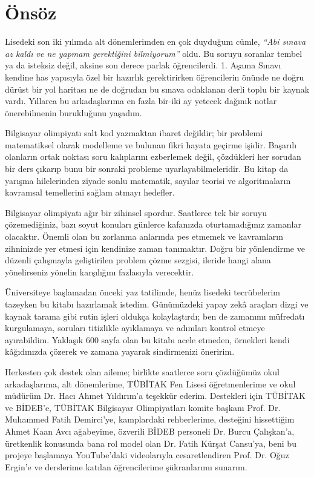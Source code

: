 \chapter*{Önsöz}
\enlargethispage{\baselineskip}

Lisedeki son iki yılımda alt dönemlerimden en çok duyduğum cümle, \textit{``Abi sınava az kaldı ve ne yapmam gerektiğini bilmiyorum''} oldu. Bu soruyu soranlar tembel ya da isteksiz değil, aksine son derece parlak öğrencilerdi. 1. Aşama Sınavı kendine has yapısıyla özel bir hazırlık gerektirirken öğrencilerin önünde ne doğru dürüst bir yol haritası ne de doğrudan bu sınava odaklanan derli toplu bir kaynak vardı. Yıllarca bu arkadaşlarıma en fazla bir-iki ay yetecek dağınık notlar önerebilmenin burukluğunu yaşadım.

Bilgisayar olimpiyatı salt kod yazmaktan ibaret değildir; bir problemi matematiksel olarak modelleme ve bulunan fikri hayata geçirme işidir. Başarılı olanların ortak noktası soru kalıplarını ezberlemek değil, çözdükleri her sorudan bir ders çıkarıp bunu bir sonraki probleme uyarlayabilmeleridir. Bu kitap da yarışma hilelerinden ziyade sonlu matematik, sayılar teorisi ve algoritmaların kavramsal temellerini sağlam atmayı hedefler.

Bilgisayar olimpiyatı ağır bir zihinsel spordur. Saatlerce tek bir soruyu çözemediğiniz, bazı soyut konuları günlerce kafanızda oturtamadığınız zamanlar olacaktır. Önemli olan bu zorlanma anlarında pes etmemek ve kavramların zihninizde yer etmesi için kendinize zaman tanımaktır. Doğru bir yönlendirme ve düzenli çalışmayla geliştirilen problem çözme sezgisi, ileride hangi alana yönelirseniz yönelin karşılığını fazlasıyla verecektir.

Üniversiteye başlamadan önceki yaz tatilimde, henüz lisedeki tecrübelerim tazeyken bu kitabı hazırlamak istedim. Günümüzdeki yapay zekâ araçları dizgi ve kaynak tarama gibi rutin işleri oldukça kolaylaştırdı; ben de zamanımı müfredatı kurgulamaya, soruları titizlikle ayıklamaya ve adımları kontrol etmeye ayırabildim. Yaklaşık 600 sayfa olan bu kitabı acele etmeden, örnekleri kendi kâğıdınızda çözerek ve zamana yayarak sindirmenizi öneririm.

Herkesten çok destek olan aileme; birlikte saatlerce soru çözdüğümüz okul arkadaşlarıma, alt dönemlerime, TÜBİTAK Fen Lisesi öğretmenlerime ve okul müdürüm Dr. Hacı Ahmet Yıldırım'a teşekkür ederim. Destekleri için TÜBİTAK ve BİDEB'e, TÜBİTAK Bilgisayar Olimpiyatları komite başkanı Prof. Dr. Muhammed Fatih Demirci'ye, kamplardaki rehberlerime, desteğini hissettiğim Ahmet Kaan Avcı ağabeyime, özverili BİDEB personeli Dr. Burcu Çalışkan'a, üretkenlik konusunda bana rol model olan Dr. Fatih Kürşat Cansu'ya, beni bu projeye başlamaya YouTube'daki videolarıyla cesaretlendiren Prof. Dr. Oğuz Ergin'e ve derslerime katılan öğrencilerime şükranlarımı sunarım.

\clearpage